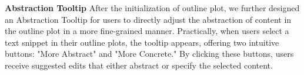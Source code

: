 

\noindent \textbf{Abstraction Tooltip}
After the initialization of outline plot, we further designed an Abstraction Tooltip for users to directly adjust the abstraction of content in the outline plot in a more fine-grained manner. Practically, when users select a text snippet in their outline plots, the tooltip appears, offering two intuitive buttons: "More Abstract" and "More Concrete." By clicking these buttons, users receive suggested edits that either abstract or specify the selected content. 


